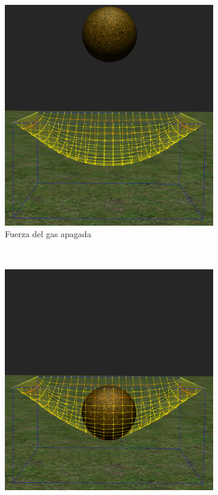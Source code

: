 \begin{figure}
 \centering
  \begin{subfigure}[b]{0.45\textwidth}
    \includegraphics[width=\textwidth]{Img/04/modPress1}
    \caption{Fuerza del gas apagada}
    \label{pres:test1}
  \end{subfigure}
~
  \begin{subfigure}[b]{0.45\textwidth}
    \includegraphics[width=\textwidth]{Img/04/modPress2}

\end{subfigure}
\end{figure}
